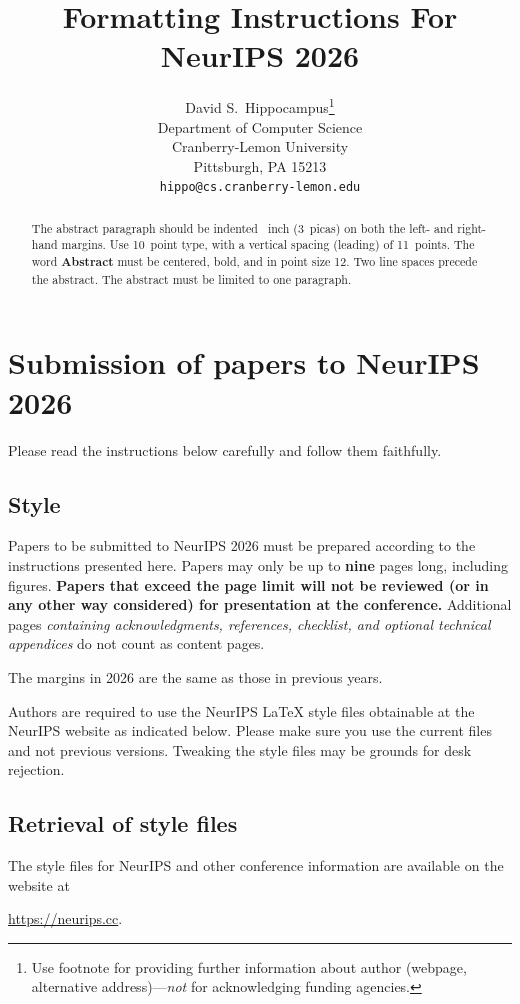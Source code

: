 \documentclass{article}
\title{Formatting Instructions For NeurIPS 2026}
\author{%
  David S.~Hippocampus\thanks{Use footnote for providing further information
    about author (webpage, alternative address)---\emph{not} for acknowledging
    funding agencies.} \\
  Department of Computer Science\\
  Cranberry-Lemon University\\
  Pittsburgh, PA 15213 \\
  \texttt{hippo@cs.cranberry-lemon.edu} \\
}
\begin{document}
\maketitle


\begin{abstract}
  The abstract paragraph should be indented ~inch (3~picas) on both the left- and right-hand margins. Use 10~point type, with a vertical spacing (leading) of 11~points. The word \textbf{Abstract} must be centered, bold, and in point size 12. Two line spaces precede the abstract. The abstract must be limited to one paragraph.
\end{abstract}



\section{Submission of papers to NeurIPS 2026}


Please read the instructions below carefully and follow them faithfully.


\subsection{Style}


Papers to be submitted to NeurIPS 2026 must be prepared according to the
instructions presented here. Papers may only be up to {\bf nine} pages long, including figures. \textbf{Papers that exceed the page limit will not be reviewed (or in any other way considered) for presentation at the conference.}
Additional pages \emph{containing acknowledgments, references, checklist, and optional technical appendices} do not count as content pages. 


The margins in 2026 are the same as those in previous years.


Authors are required to use the NeurIPS \LaTeX{} style files obtainable at the NeurIPS website as indicated below. Please make sure you use the current files and not previous versions. Tweaking the style files may be grounds for desk rejection.


\subsection{Retrieval of style files}


The style files for NeurIPS and other conference information are available on the website at
\begin{center}
  \url{https://neurips.cc}.
\end{center}
\end{document}
